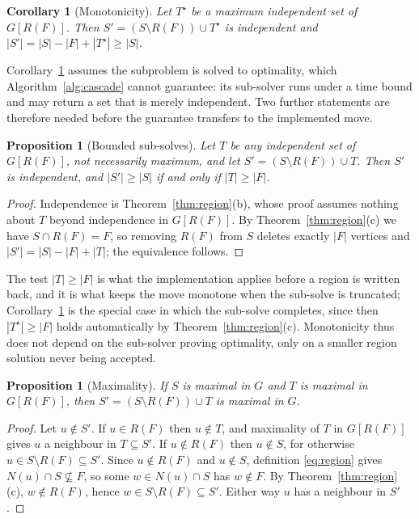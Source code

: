 \documentclass[pdflatex,sn-mathphys-num]{sn-jnl}
\theoremstyle{thmstyleone}%
\newtheorem{proposition}[theorem]{Proposition}%
\newtheorem{corollary}[theorem]{Corollary}%
\theoremstyle{thmstyletwo}%
\begin{document}
\begin{corollary}[Monotonicity]
\label{cor:monotone}
Let $T^\star$ be a maximum independent set of $G[R(F)]$. Then
$S' = (S \setminus R(F)) \cup T^\star$ is independent and
$|S'| = |S| - |F| + |T^\star| \ge |S|$.
\end{corollary}

Corollary~\ref{cor:monotone} assumes the subproblem is solved to optimality,
which Algorithm~\ref{alg:cascade} cannot guarantee: its sub-solver runs under a
time bound and may return a set that is merely independent. Two further
statements are therefore needed before the guarantee transfers to the
implemented move.

\begin{proposition}[Bounded sub-solves]
\label{prop:bounded}
Let $T$ be any independent set of $G[R(F)]$, not necessarily maximum, and let
$S' = (S \setminus R(F)) \cup T$. Then $S'$ is independent, and
$|S'| \ge |S|$ if and only if $|T| \ge |F|$.
\end{proposition}

\begin{proof}
Independence is Theorem~\ref{thm:region}(b), whose proof assumes nothing about
$T$ beyond independence in $G[R(F)]$. By Theorem~\ref{thm:region}(c) we have
$S \cap R(F) = F$, so removing $R(F)$ from $S$ deletes exactly $|F|$ vertices and
$|S'| = |S| - |F| + |T|$; the equivalence follows.
\end{proof}

The test $|T| \ge |F|$ is what the implementation applies before a region is
written back, and it is what keeps the move monotone when the sub-solve is
truncated; Corollary~\ref{cor:monotone} is the special case in which the
sub-solve completes, since then $|T^\star| \ge |F|$ holds automatically by
Theorem~\ref{thm:region}(c). Monotonicity thus does not depend on the sub-solver
proving optimality, only on a smaller region solution never being accepted.

\begin{proposition}[Maximality]
\label{prop:maximal}
If $S$ is maximal in $G$ and $T$ is maximal in $G[R(F)]$, then
$S' = (S \setminus R(F)) \cup T$ is maximal in $G$.
\end{proposition}

\begin{proof}
Let $u \notin S'$. If $u \in R(F)$ then $u \notin T$, and maximality of $T$ in
$G[R(F)]$ gives $u$ a neighbour in $T \subseteq S'$. If $u \notin R(F)$ then
$u \notin S$, for otherwise $u \in S \setminus R(F) \subseteq S'$. Since
$u \notin R(F)$ and $u \notin S$, definition \eqref{eq:region} gives
$N(u) \cap S \not\subseteq F$, so some $w \in N(u) \cap S$ has $w \notin F$. By
Theorem~\ref{thm:region}(c), $w \notin R(F)$, hence
$w \in S \setminus R(F) \subseteq S'$. Either way $u$ has a neighbour in $S'$.
\end{proof}
\end{document}
